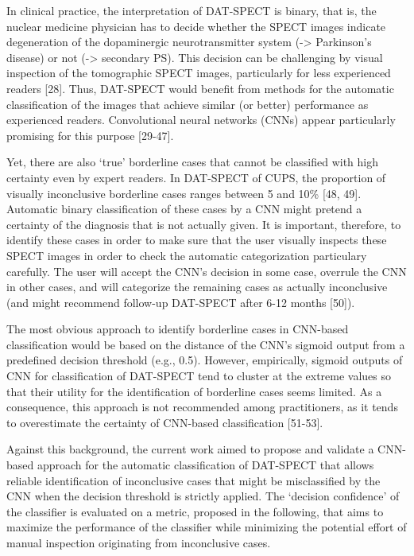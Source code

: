 In clinical practice, the interpretation of DAT-SPECT is binary, that is, the nuclear medicine physician has to decide whether the SPECT images 
indicate degeneration of the dopaminergic neurotransmitter system (-> Parkinson's disease) or not (-> secondary PS). 
This decision can be challenging by visual inspection of the tomographic SPECT images, particularly for less experienced readers [28]. 
Thus, DAT-SPECT would benefit from methods for the automatic classification of the images that achieve similar (or better) performance as experienced readers. 
Convolutional neural networks (CNNs) appear particularly promising for this purpose [29-47].

Yet, there are also `true' borderline cases that cannot be classified with high certainty even by expert readers. 
In DAT-SPECT of CUPS, the proportion of visually inconclusive borderline cases ranges between 5 and 10\% [48, 49]. 
Automatic binary classification of these cases by a CNN might pretend a certainty of the diagnosis that is not actually given. 
It is important, therefore, to identify these cases in order to make sure that the user visually inspects these SPECT images 
in order to check the automatic categorization particulary carefully. 
The user will accept the CNN's decision in some case, overrule the CNN in other cases, and will categorize the remaining cases as 
actually inconclusive (and might recommend follow-up DAT-SPECT after 6-12 months [50]). 

The most obvious approach to identify borderline cases in CNN-based classification would be based on the distance of the CNN's sigmoid output from a predefined decision threshold (e.g., 0.5). 
However, empirically, sigmoid outputs of CNN for classification of DAT-SPECT tend to cluster at the extreme values so that their utility for the identification of borderline cases seems limited.  
As a consequence, this approach is not recommended among practitioners, as it tends to overestimate the certainty of CNN-based classification [51-53].


Against this background, the current work aimed to propose and validate a CNN-based approach for the automatic classification of DAT-SPECT 
that allows reliable identification of inconclusive cases that might be misclassified by the CNN when the decision threshold is strictly applied.
The `decision confidence' of the classifier is evaluated on a metric, proposed in the following, that aims to maximize the performance of the classifier
while minimizing the potential effort of manual inspection originating from inconclusive cases.


